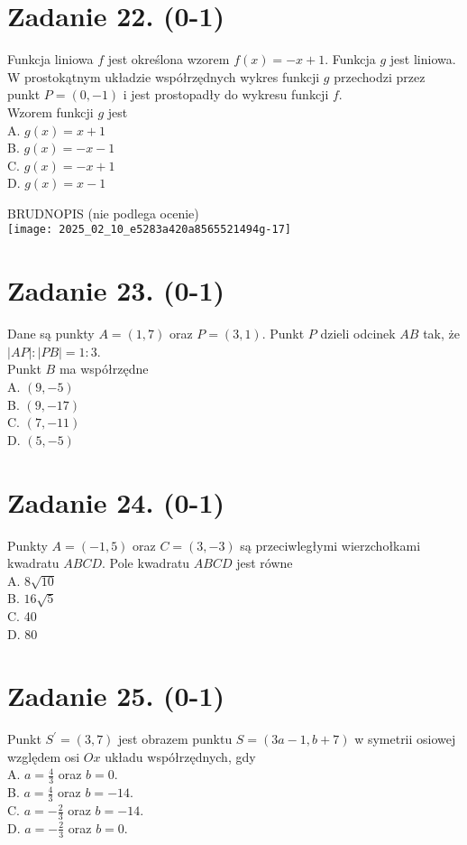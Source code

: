 \documentclass[10pt]{article}
\begin{document}
\section*{Zadanie 22. (0-1)}
Funkcja liniowa \(f\) jest określona wzorem \(f(x)=-x+1\). Funkcja \(g\) jest liniowa. W prostokątnym układzie współrzędnych wykres funkcji \(g\) przechodzi przez punkt \(P=(0,-1)\) i jest prostopadły do wykresu funkcji \(f\).\\
Wzorem funkcji \(g\) jest\\
A. \(g(x)=x+1\)\\
B. \(g(x)=-x-1\)\\
C. \(g(x)=-x+1\)\\
D. \(g(x)=x-1\)

BRUDNOPIS (nie podlega ocenie)\\
\texttt{[image: 2025\_02\_10\_e5283a420a8565521494g-17]}

\section*{Zadanie 23. (0-1)}
Dane są punkty \(A=(1,7)\) oraz \(P=(3,1)\). Punkt \(P\) dzieli odcinek \(A B\) tak, że \(|A P|:|P B|=1: 3\).\\
Punkt \(B\) ma współrzędne\\
A. \((9,-5)\)\\
B. \((9,-17)\)\\
C. \((7,-11)\)\\
D. \((5,-5)\)

\section*{Zadanie 24. (0-1)}
Punkty \(A=(-1,5)\) oraz \(C=(3,-3)\) są przeciwległymi wierzchołkami kwadratu \(A B C D\). Pole kwadratu \(A B C D\) jest równe\\
A. \(8 \sqrt{10}\)\\
B. \(16 \sqrt{5}\)\\
C. 40\\
D. 80

\section*{Zadanie 25. (0-1)}
Punkt \(S^{\prime}=(3,7)\) jest obrazem punktu \(S=(3 a-1, b+7)\) w symetrii osiowej względem osi \(O x\) układu współrzędnych, gdy\\
A. \(a=\frac{4}{3}\) oraz \(b=0\).\\
B. \(a=\frac{4}{3}\) oraz \(b=-14\).\\
C. \(a=-\frac{2}{3}\) oraz \(b=-14\).\\
D. \(a=-\frac{2}{3}\) oraz \(b=0\).
\end{document}
